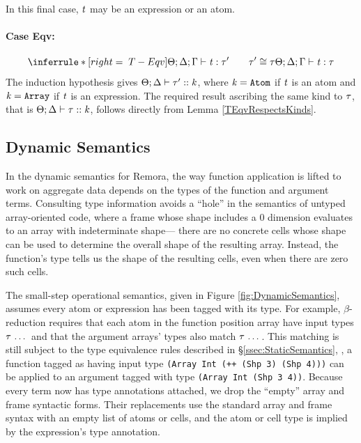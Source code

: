 \begin{sproof}
  In this final case, $\mathit{t}$ may be an expression or an atom.
  \paragraph{Case {\sc Eqv}:}
  \[{\infr[T-Eqv]
    {\typeof{\sEnv}{\kEnv}{\tEnv}{\term}{\type'}
      \qquad
      \teqv{\type'}{\type}}
    {\typeof{\sEnv}{\kEnv}{\tEnv}{\term}{\type}}}\]
  The induction hypothesis gives
  $\Theta;\Delta \vdash \mathit{\tau}' :: \mathit{k}$,
  where $\mathit{k} = \text{\tt Atom}$ if $\mathit{t}$ is an atom
  and  $\mathit{k} = \text{\tt Array}$ if $\mathit{t}$ is an expression.
  The required result ascribing the same kind to $\mathit{\tau}$,
  that is
  $\Theta;\Delta \vdash \mathit{\tau} :: \mathit{k}$,
  follows directly from Lemma \ref{TEqvRespectsKinds}.
\end{sproof}

\subsection{Dynamic Semantics}
In the dynamic semantics for Remora,
the way function application is lifted to work on aggregate data
depends on the types of the function and argument terms.
Consulting type information avoids a ``hole'' in the semantics of
untyped array-oriented code,
where a frame whose shape includes a 0 dimension
evaluates to an array with indeterminate shape---%
there are no concrete cells whose shape can be used to
determine the overall shape of the resulting array.
Instead, the function's type tells us
the shape of the resulting cells,
even when there are zero such cells.

The small-step operational semantics,
given in Figure \ref{fig:DynamicSemantics},
assumes every atom or expression has been tagged with its type.
For example, $\beta$-reduction requires
that each atom in the function position array have input types $\mathit{\tau} \, \ldots \,$
and that the argument arrays' types also match $\mathit{\tau} \, \ldots \,$.
This matching is still subject to the type equivalence rules described in \S\ref{ssec:StaticSemantics},
\eg, a function tagged as having input type {\tt (Array Int (++ (Shp 3) (Shp 4)))}
can be applied to an argument tagged with type {\tt (Array Int (Shp 3 4))}.
Because every term now has type annotations attached,
we drop the ``empty'' array and frame syntactic forms.
Their replacements use the standard array and frame syntax
with an empty list of atoms or cells,
and the atom or cell type is implied by the expression's type annotation.

